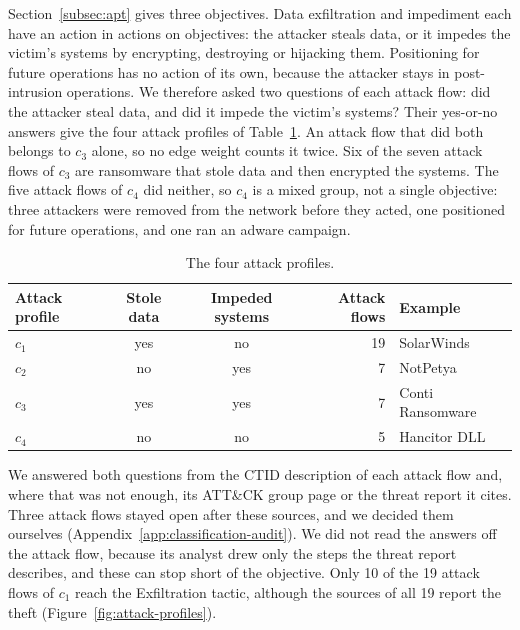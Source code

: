 \documentclass{cshonours}
\newcommand{\tablestyle}{\footnotesize\renewcommand{\arraystretch}{1.0}\rowcolors{2}{}{black!5}}
\begin{document}
Section~\ref{subsec:apt} gives three objectives. Data exfiltration and
impediment each have an action in actions on objectives: the attacker steals
data, or it impedes the victim's systems by encrypting, destroying or
hijacking them. Positioning for future operations has no action of its own,
because the attacker stays in post-intrusion operations. We therefore asked
two questions of each attack flow: did the attacker steal data, and did it
impede the victim's systems? Their yes-or-no answers give
the four attack profiles of Table~\ref{tab:attack-profiles}. An attack flow
that did both belongs to $c_3$ alone, so no edge weight counts it twice.
Six of the seven attack flows of $c_3$ are ransomware that stole data and
then encrypted the systems. The five attack flows of $c_4$ did neither,
so $c_4$ is a mixed group, not a single objective: three attackers were removed from the network before
they acted, one positioned for future operations, and one ran an adware
campaign.

\begin{table}[ht]
  \centering
  \caption[The four attack profiles]{The four attack profiles.}
  \label{tab:attack-profiles}
  \tablestyle
  \begin{tabular}{@{}lccrl@{}}
    \toprule
    Attack profile & Stole data & Impeded systems & Attack flows & Example \\
    \midrule
    $c_1$ & yes & no  & 19 & SolarWinds \\
    $c_2$ & no  & yes &  7 & NotPetya \\
    $c_3$ & yes & yes &  7 & Conti Ransomware \\
    $c_4$ & no  & no  &  5 & Hancitor DLL \\
    \bottomrule
  \end{tabular}
\end{table}

We answered both questions from the CTID description of each attack flow
and, where that was not enough, its ATT\&CK group page or the threat report
it cites. Three attack flows stayed open after these sources, and we decided
them ourselves (Appendix~\ref{app:classification-audit}). We did not read the
answers off the attack flow, because its analyst drew only the steps the
threat report describes, and these can stop short of the objective. Only 10
of the 19
attack flows of $c_1$ reach the Exfiltration tactic, although the sources of
all 19 report the theft (Figure~\ref{fig:attack-profiles}).
\end{document}

